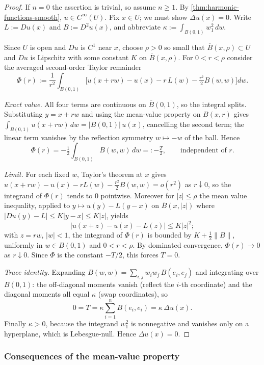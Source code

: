 \begin{proof}
\leanok
If $n = 0$ the assertion is trivial, so assume $n \ge 1$. By
\cref{thm:harmonic-functions-smooth}, $u \in C^\infty(U)$. Fix $x \in U$; we must
show $\Delta u(x) = 0$. Write $L := Du(x)$ and $B := D^2u(x)$, and abbreviate
$\kappa := \int_{B(0,1)} w_1^2 \, dw$.

Since $U$ is open and $Du$ is $C^1$ near $x$, choose $\rho > 0$ so small that
$\overline{B}(x,\rho) \subset U$ and $Du$ is Lipschitz with some constant $K$ on
$\overline{B}(x,\rho)$. For $0 < r < \rho$ consider the averaged second-order Taylor
remainder
$$\Phi(r) := \frac{1}{r^2} \int_{B(0,1)}
  \Big[ u(x+rw) - u(x) - r\,L(w) - \tfrac{r^2}{2} B(w,w) \Big] dw.$$

\emph{Exact value.} All four terms are continuous on $\overline{B}(0,1)$, so the
integral splits. Substituting $y = x + rw$ and using the mean-value property on
$B(x,r)$ gives $\int_{B(0,1)} u(x+rw)\,dw = |B(0,1)|\,u(x)$, cancelling the second
term; the linear term vanishes by the reflection symmetry $w \mapsto -w$ of the ball.
Hence
$$\Phi(r) = -\tfrac{1}{2} \int_{B(0,1)} B(w,w)\, dw =: -\tfrac{T}{2},
  \qquad \text{independent of } r.$$

\emph{Limit.} For each fixed $w$, Taylor's theorem at $x$ gives
$u(x+rw) - u(x) - r L(w) - \tfrac{r^2}{2} B(w,w) = o(r^2)$ as $r \downarrow 0$, so
the integrand of $\Phi(r)$ tends to $0$ pointwise. Moreover for $|z| \le \rho$ the
mean value inequality, applied to $y \mapsto u(y) - L(y - x)$ on
$\overline{B}(x,|z|)$ where $|Du(y) - L| \le K|y-x| \le K|z|$, yields
$$|u(x+z) - u(x) - L(z)| \le K |z|^2 ;$$
with $z = rw$, $|w| < 1$, the integrand of $\Phi(r)$ is bounded by
$K + \tfrac{1}{2}\|B\|$, uniformly in $w \in B(0,1)$ and $0 < r < \rho$. By
dominated convergence, $\Phi(r) \to 0$ as $r \downarrow 0$. Since $\Phi$ is the
constant $-T/2$, this forces $T = 0$.

\emph{Trace identity.} Expanding $B(w,w) = \sum_{i,j} w_i w_j\, B(e_i,e_j)$ and
integrating over $B(0,1)$: the off-diagonal moments vanish (reflect the $i$-th
coordinate) and the diagonal moments all equal $\kappa$ (swap coordinates), so
$$0 = T = \kappa \sum_{i=1}^n B(e_i,e_i) = \kappa\, \Delta u(x).$$
Finally $\kappa > 0$, because the integrand $w_1^2$ is nonnegative and vanishes only
on a hyperplane, which is Lebesgue-null. Hence $\Delta u(x) = 0$.
\end{proof}

\subsubsection{Consequences of the mean-value property}
\label{sec:laplace-mean-value-consequences}

